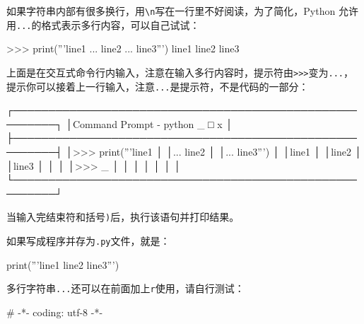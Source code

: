 如果字符串内部有很多换行，用\texttt{\textbackslash{}n}写在一行里不好阅读，为了简化，Python
允许用\texttt{\textquotesingle{}\textquotesingle{}\textquotesingle{}...\textquotesingle{}\textquotesingle{}\textquotesingle{}}的格式表示多行内容，可以自己试试：

\begin{pythoncode}
>>> print('''line1
... line2
... line3''')
line1
line2
line3
\end{pythoncode}

上面是在交互式命令行内输入，注意在输入多行内容时，提示符由\texttt{\textgreater{}\textgreater{}\textgreater{}}变为\texttt{...}，提示你可以接着上一行输入，注意\texttt{...}是提示符，不是代码的一部分：

\begin{pythoncode}
┌────────────────────────────────────────────────────────┐
│Command Prompt - python                           _ □ x │
├────────────────────────────────────────────────────────┤
│>>> print('''line1                                      │
│... line2                                               │
│... line3''')                                           │
│line1                                                   │
│line2                                                   │
│line3                                                   │
│                                                        │
│>>> _                                                   │
│                                                        │
│                                                        │
│                                                        │
└────────────────────────────────────────────────────────┘
\end{pythoncode}

当输入完结束符\texttt{\textasciigrave{}\textasciigrave{}\textasciigrave{}}和括号\texttt{)}后，执行该语句并打印结果。

如果写成程序并存为\texttt{.py}文件，就是：

\begin{pythoncode}
print('''line1
line2
line3''')
\end{pythoncode}

多行字符串\texttt{\textquotesingle{}\textquotesingle{}\textquotesingle{}...\textquotesingle{}\textquotesingle{}\textquotesingle{}}还可以在前面加上\texttt{r}使用，请自行测试：

\begin{pythoncode}
# -*- coding: utf-8 -*-
\end{pythoncode}

